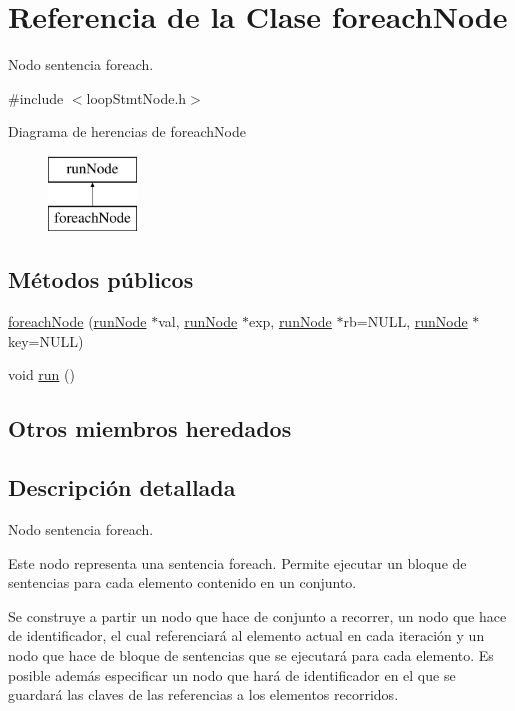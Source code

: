 \hypertarget{classforeachNode}{\section{Referencia de la Clase foreach\-Node}
\label{classforeachNode}
}


Nodo sentencia foreach.  




{\ttfamily \#include $<$loop\-Stmt\-Node.\-h$>$}

Diagrama de herencias de foreach\-Node\begin{figure}[H]
\begin{center}
\leavevmode
\includegraphics[height=2.000000cm]{classforeachNode}
\end{center}
\end{figure}
\subsection*{Métodos públicos}
\begin{DoxyCompactItemize}
\item 
\hyperlink{classforeachNode_aa30f6b951da73f3637be795670a807f3}{foreach\-Node} (\hyperlink{classrunNode}{run\-Node} $\ast$val, \hyperlink{classrunNode}{run\-Node} $\ast$exp, \hyperlink{classrunNode}{run\-Node} $\ast$rb=N\-U\-L\-L, \hyperlink{classrunNode}{run\-Node} $\ast$key=N\-U\-L\-L)
\item 
void \hyperlink{classforeachNode_a86c6a9ef828c2a700a29d725a0bc4a53}{run} ()
\end{DoxyCompactItemize}
\subsection*{Otros miembros heredados}


\subsection{Descripción detallada}
Nodo sentencia foreach. 

Este nodo representa una sentencia foreach. Permite ejecutar un bloque de sentencias para cada elemento contenido en un conjunto.

Se construye a partir un nodo que hace de conjunto a recorrer, un nodo que hace de identificador, el cual referenciará al elemento actual en cada iteración y un nodo que hace de bloque de sentencias que se ejecutará para cada elemento. Es posible además especificar un nodo que hará de identificador en el que se guardará las claves de las referencias a los elementos recorridos. 

